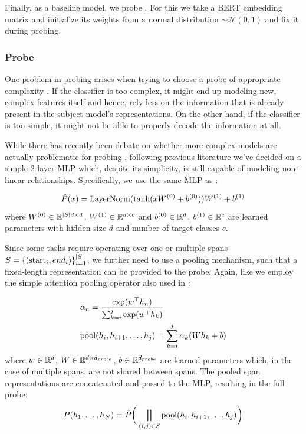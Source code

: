 Finally, as a baseline model, we probe . For this we take a BERT embedding matrix and initialize its weights from a normal distribution $\sim \mathcal{N}(0, 1)$ and fix it during probing.

\subsubsection{Probe}
\label{sec:probe}
One problem in probing arises when trying to choose a probe of appropriate complexity \cite{hewitt-liang-2019-designing}. If the classifier is too complex, it might end up modeling new, complex features itself and hence, rely less on the information that is already present in the subject model's representations. On the other hand, if the classifier is too simple, it might not be able to properly decode the information at all.

While there has recently been debate on whether more complex models are actually problematic for probing \cite{pimentel-etal-2020-information}, following previous literature \cite{Tenney2019WhatDY,tenney-etal-2019-bert, hewitt-liang-2019-designing} we've decided on a simple $2$-layer MLP which, despite its simplicity, is still capable of modeling non-linear relationships.
Specifically, we use the same MLP as \cite{Tenney2019WhatDY}:

\begin{equation}
    \hat{P}(x) = \text{LayerNorm}(\text{tanh}(x W^{(0)} + b^{(0)})) W^{(1)} + b^{(1)}
\end{equation}
where $W^{(0)} \in \mathbb{R}^{|S| d \times d}$,  $W^{(1)} \in \mathbb{R}^{d \times c}$ and $b^{(0)} \in \mathbb{R}^{d}$,  $b^{(1)} \in \mathbb{R}^{c}$ are learned parameters with hidden size $d$ and number of target classes $c$.

Since some tasks require operating over one or multiple spans $S=\{(\text{start}_i, {end}_i)\}_{i=1}^{|S|}$, we further need to use a pooling mechanism, such that a fixed-length representation can be provided to the probe.
Again, like \cite{Tenney2019WhatDY} we employ the simple attention pooling operator also used in \cite{lee-etal-2017-end, lee-etal-2018-higher}:

\begin{equation}
    \begin{aligned}
         & \alpha_n = \frac{\exp(w^\top h_n)}{\sum_{k=i}^j{\exp(w^\top h_k)}}   \\
         & \text{pool}(h_i, h_{i+1},\dots, h_j)= \sum_{k=i}^j\alpha_k (W h_k + b)
    \end{aligned}
\end{equation}
where $w \in \mathbb{R}^{d}$, $W \in \mathbb{R}^{d \times d_{probe}}$, $b \in \mathbb{R}^{d_{probe}}$ are learned parameters which, in the case of multiple spans, are not shared between spans. The pooled span representations are concatenated and passed to the MLP, resulting in the full probe:
\begin{equation}
    P(h_1,\dots, h_N) = \hat{P}\bigg(\bigparallel_{(i, j) \in S}{\text{pool}(h_i, h_{i+1},\dots, h_j)}\bigg)
\end{equation}

